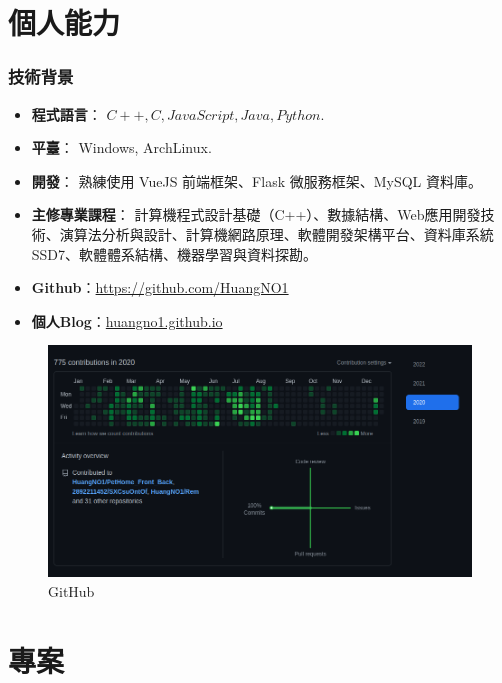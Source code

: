 \documentclass[classical]{einfart}
\begin{document}


\part{個人能力}

\section{技術背景}

\begin{itemize}[parsep=0.5ex]
    \item \textbf{程式語言}： $C++, C, JavaScript, Java, Python$.
    \item \textbf{平臺}： Windows, ArchLinux.
    \item \textbf{開發}： 熟練使用 VueJS 前端框架、Flask 微服務框架、MySQL 資料庫。
    \item \textbf{主修專業課程}： 計算機程式設計基礎（C++）、數據結構、Web應用開發技術、演算法分析與設計、計算機網路原理、軟體開發架構平台、資料庫系統SSD7、軟體體系結構、機器學習與資料探勘。
    \item \textbf{Github}：\href{https://github.com/HuangNO1}{https://github.com/HuangNO1}
    \item \textbf{個人Blog}：\href{huangno1.github.io}{huangno1.github.io}
\end{itemize}

\begin{figure}[H]
  \centering
  \includegraphics[width=1\textwidth]{img/2020_github.png}
  \caption{GitHub}
\end{figure}

\newpage

\part{專案}
\end{document}
